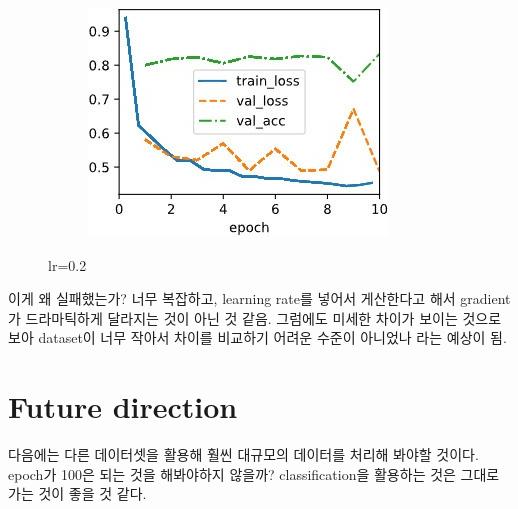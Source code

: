 \documentclass{article}
\begin{document}
\begin{figure}[ht]
\begin{center}
\begin{subfigure}[b]{0.3\columnwidth}
\includegraphics[width=\columnwidth]{img/lr0.2 cosine0.01.jpg}
\end{subfigure}
\caption{lr=0.2}
\label{lr-0.2}
\end{center}
\vskip -0.2in
\end{figure}
이게 왜 실패했는가? 너무 복잡하고, learning rate를 넣어서 게산한다고 해서 gradient가 드라마틱하게 달라지는 것이 아닌 것 같음. 그럼에도 미세한 차이가 보이는 것으로 보아 dataset이 너무 작아서 차이를 비교하기 어려운 수준이 아니었나 라는 예상이 됨.


\section{Future direction}
다음에는 다른 데이터셋을 활용해 훨씬 대규모의 데이터를 처리해 봐야할 것이다. epoch가 100은 되는 것을 해봐야하지 않을까?
classification을 활용하는 것은 그대로 가는 것이 좋을 것 같다.



\clearpage
\end{document}
